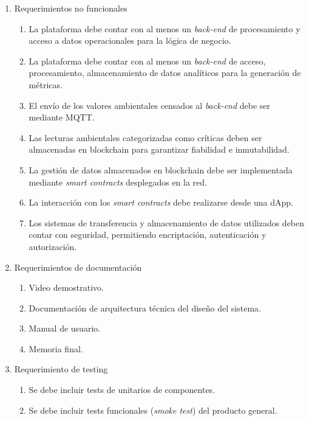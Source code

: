 \documentclass[
11pt, %
]{charter}
\begin{document}
\begin{enumerate}
					
	\item Requerimientos no funcionales		
	\begin{enumerate}	
		\item La plataforma debe contar con al menos un \textit{back-end} de procesamiento y acceso a datos operacionales para la lógica de negocio.
		\item La plataforma debe contar con al menos un \textit{back-end} de acceso, procesamiento, almacenamiento de datos analíticos para la generación de métricas.		
		\item El envío de los valores ambientales censados al \textit{back-end} debe ser mediante MQTT.
		\item Las lecturas ambientales categorizadas como críticas deben ser almacenadas en blockchain para garantizar fiabilidad e inmutabilidad.
		\item La gestión de datos almacenados en blockchain debe ser implementada mediante \textit{smart contracts} desplegados en la red.
		\item La interacción con los \textit{smart contracts} debe realizarse desde una dApp.
		\item Los sistemas de transferencia y almacenamiento de datos utilizados deben contar con seguridad, permitiendo encriptación, autenticación y autorización.	
		\end{enumerate}	
		
	\item Requerimientos de documentación		
		\begin{enumerate}			
			\item Video demostrativo.	
			\item Documentación de arquitectura técnica del diseño del sistema.			
			\item Manual de usuario.	
			\item Memoria final.	
		\end{enumerate}	
		

\vspace{4em}
		
		
	\item Requerimiento de testing		
		\begin{enumerate}			
			\item Se debe incluir tests de unitarios de componentes.
			\item Se debe incluir tests funcionales (\textit{smoke test}) del producto general.		
		\end{enumerate}	
	

\end{enumerate}
\end{document}

